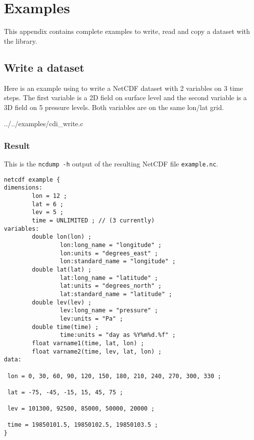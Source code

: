 
\chapter{\label{example}Examples}

This appendix contains complete examples to write, read
and copy a dataset with the {\CDI} library.


\section{\label{example_write}Write a dataset}

Here is an example using {\CDI} to write a NetCDF dataset with 
2 variables on 3 time steps. The first variable is a 2D field
on surface level and the second variable is a 3D field on 5 pressure
levels. Both variables are on the same lon/lat grid. 


{../../examples/cdi_write.c}


\subsection{Result}

This is the \texttt{ncdump -h} output of the resulting NetCDF file \texttt{example.nc}.

\begin{lstlisting}[]
netcdf example {
dimensions:
        lon = 12 ;
        lat = 6 ;
        lev = 5 ;
        time = UNLIMITED ; // (3 currently)
variables:
        double lon(lon) ;
                lon:long_name = "longitude" ;
                lon:units = "degrees_east" ;
                lon:standard_name = "longitude" ;
        double lat(lat) ;
                lat:long_name = "latitude" ;
                lat:units = "degrees_north" ;
                lat:standard_name = "latitude" ;
        double lev(lev) ;
                lev:long_name = "pressure" ;
                lev:units = "Pa" ;
        double time(time) ;
                time:units = "day as %Y%m%d.%f" ;
        float varname1(time, lat, lon) ;
        float varname2(time, lev, lat, lon) ;
data:

 lon = 0, 30, 60, 90, 120, 150, 180, 210, 240, 270, 300, 330 ;

 lat = -75, -45, -15, 15, 45, 75 ;

 lev = 101300, 92500, 85000, 50000, 20000 ;

 time = 19850101.5, 19850102.5, 19850103.5 ;
}
\end{lstlisting}


